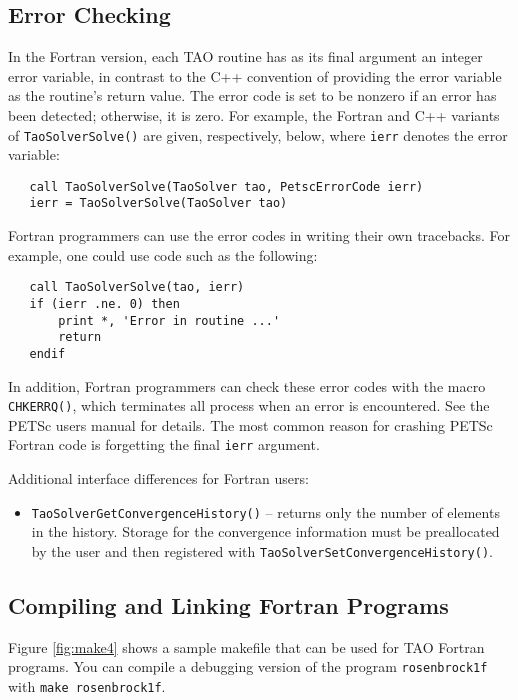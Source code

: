 \subsection{Error Checking}
\label{sec:fortran_errors}

In the Fortran version, each TAO routine has as its final argument
an integer error variable, in contrast to the C++ convention of
providing the error variable as the routine's return value.  The error
code is set to be nonzero if an error has been detected; otherwise, it
is zero.  For example, the Fortran and C++ variants of {\tt TaoSolverSolve()} are
given, respectively, below, where {\tt ierr} denotes the error variable:
\begin{verbatim}
   call TaoSolverSolve(TaoSolver tao, PetscErrorCode ierr)
   ierr = TaoSolverSolve(TaoSolver tao)
\end{verbatim}
\noindent

Fortran programmers can use the error codes in writing their own
tracebacks.  For example, one could use code such as the following:
\begin{verbatim}
   call TaoSolverSolve(tao, ierr)
   if (ierr .ne. 0) then
       print *, 'Error in routine ...'
       return
   endif
\end{verbatim}
\noindent
In addition, Fortran programmers can check these error codes with the
macro {\tt CHKERRQ()}, which terminates all process when an error
is encountered.  See the PETSc users manual for details.  The most
common reason for crashing PETSc Fortran code is forgetting the final
{\tt ierr} argument.

Additional interface differences for Fortran users:
\begin{itemize}
\item \texttt{TaoSolverGetConvergenceHistory()} -- returns only the number of 
elements in the history.  Storage for the convergence information must 
be preallocated by the user and then registered with 
\texttt{TaoSolverSetConvergenceHistory()}.
\end{itemize}

\subsection{Compiling and Linking Fortran Programs}
\label{sec:fortcompile}

Figure \ref{fig:make4} shows a sample makefile that can be used for
TAO Fortran programs.  You can compile a debugging
version of the program {\tt rosenbrock1f} with 
{\tt make rosenbrock1f}.

